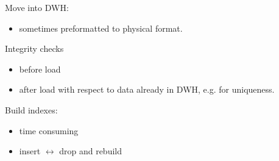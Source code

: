 \begin{breakbox}
\newline Move into DWH:
\begin{itemize}
	\item sometimes preformatted to physical format.
\end{itemize}
Integrity checks
\begin{itemize}
	\item before load
	\item after load with respect to data already in DWH, e.g. for uniqueness.
\end{itemize}
Build indexes:
\begin{itemize}
	\item time consuming
	\item insert $\leftrightarrow$ drop and rebuild
\end{itemize}
\end{breakbox}
